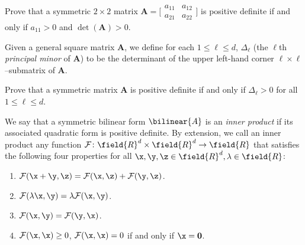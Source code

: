 \begin{problem}
Prove that a symmetric $2\times 2$ matrix $\boldsymbol{A} = \big[ \begin{smallmatrix} a_{11} & a_{12} \\ a_{21} & a_{22} \end{smallmatrix} \big]$ is positive definite if and only if $a_{11}>0$ and $\det(\boldsymbol{A})>0$.
\end{problem}

\begin{problem}\label{problem:PrincipalMinors}
Given a general square matrix $\boldsymbol{A}$, we define for each $1\leq \ell \leq d$, $\Delta_\ell$ (the $\ell$th \emph{principal minor} of $\boldsymbol{A}$) to be the determinant of the upper left-hand corner $\ell \times \ell$--submatrix of $\boldsymbol{A}$.  
\begin{center}
\end{center}
Prove that a symmetric matrix $\boldsymbol{A}$ is positive definite if and only if $\Delta_\ell > 0$ for all $1\leq \ell \leq d$.
\end{problem}

\begin{example}\label{example:innerprod}
We say that a symmetric bilinear form $\bilinear{A}$ is an \emph{inner product} if its associated quadratic form is positive definite.  By extension, we call an inner product any function $\mathcal{F} \colon \field{R}^d \times \field{R}^d \to \field{R}$ that satisfies the following four properties for all $\x, \y, \z \in \field{R}^d, \lambda \in \field{R}$:
\begin{enumerate}
\item $\mathcal{F}(\x+\y, \z) = \mathcal{F}(\x, \z) + \mathcal{F}(\y, \z)$.
\item $\mathcal{F}(\lambda \x, \y) = \lambda \mathcal{F}(\x, \y)$.
\item $\mathcal{F}(\x, \y) = \mathcal{F}(\y, \x)$.
\item $\mathcal{F}(\x, \x) \geq 0$, $\mathcal{F}(\x, \x) = 0$ if and only if $\x = \boldsymbol{0}$.
\end{enumerate}
\end{example}

